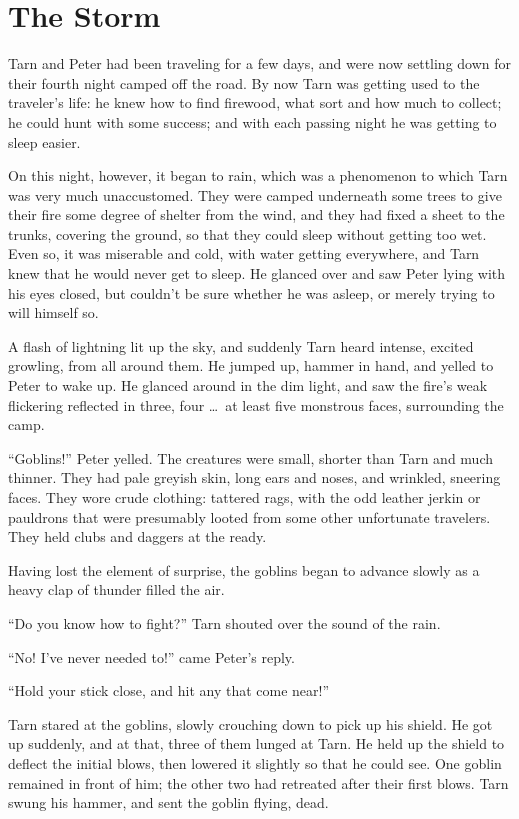 \chapter{The Storm}
Tarn and Peter had been traveling for a few days, and were now settling down for their fourth night camped off the road.  By now Tarn was getting used to the traveler's life: he knew how to find firewood, what sort and how much to collect; he could hunt with some success; and with each passing night he was getting to sleep easier.

On this night, however, it began to rain, which was a phenomenon to which Tarn was very much unaccustomed.  They were camped underneath some trees to give their fire some degree of shelter from the wind, and they had fixed a sheet to the trunks, covering the ground, so that they could sleep without getting too wet.  Even so, it was miserable and cold, with water getting everywhere, and Tarn knew that he would never get to sleep.  He glanced over and saw Peter lying with his eyes closed, but couldn't be sure whether he was asleep, or merely trying to will himself so.

A flash of lightning lit up the sky, and suddenly Tarn heard intense, excited growling, from all around them.  He jumped up, hammer in hand, and yelled to Peter to wake up.  He glanced around in the dim light, and saw the fire's weak flickering reflected in three, four \ldots\  at least five monstrous faces, surrounding the camp.

``Goblins!'' Peter yelled.  The creatures were small, shorter than Tarn and much thinner.  They had pale greyish skin, long ears and noses, and wrinkled, sneering faces.  They wore crude clothing: tattered rags, with the odd leather jerkin or pauldrons that were presumably looted from some other unfortunate travelers.  They held clubs and daggers at the ready.

Having lost the element of surprise, the goblins began to advance slowly as a heavy clap of thunder filled the air.

``Do you know how to fight?'' Tarn shouted over the sound of the rain.

``No!  I've never needed to!'' came Peter's reply.

``Hold your stick close, and hit any that come near!''

Tarn stared at the goblins, slowly crouching down to pick up his shield.  He got up suddenly, and at that, three of them lunged at Tarn.  He held up the shield to deflect the initial blows, then lowered it slightly so that he could see.  One goblin remained in front of him; the other two had retreated after their first blows.  Tarn swung his hammer, and sent the goblin flying, dead.

